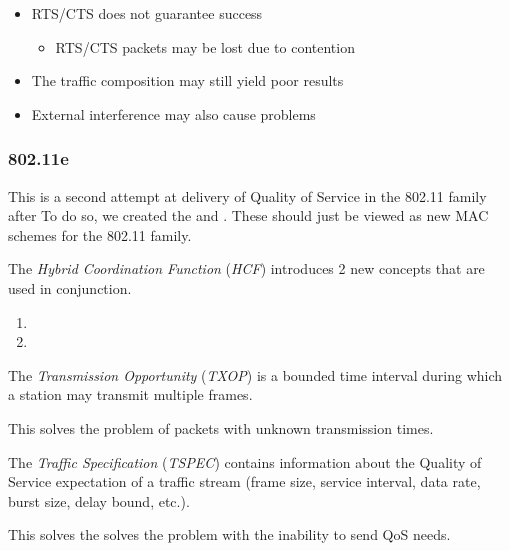 \begin{itemize}[noitemsep]
\item RTS/CTS does not guarantee success
  \begin{itemize}[noitemsep]
  \item RTS/CTS packets may be lost due to contention
  \end{itemize}

\item The traffic composition may still yield poor results
\item External interference may also cause problems
\end{itemize}

\subsubsection{802.11e}\label{subsubsec:802.11e}
This is a second attempt at delivery of Quality of Service in the 802.11 family after 
To do so, we created the  and .
These should just be viewed as new MAC schemes for the 802.11 family.

\begin{definition}\label{def:HCF}
  The \emph{Hybrid Coordination Function} (\emph{HCF}) introduces 2 new concepts that are used in conjunction.
  \begin{enumerate}[noitemsep]
  \item {}
  \item {}
  \end{enumerate}
\end{definition}

\begin{definition}\label{def:Tx_Opportunity}
  The \emph{Transmission Opportunity} (\emph{TXOP}) is a bounded time interval during which a station may transmit multiple frames.

  This solves the  problem of packets with unknown transmission times.
\end{definition}

\begin{definition}\label{def:Traffic_Specification}
  The \emph{Traffic Specification} (\emph{TSPEC}) contains information about the Quality of Service expectation of a traffic stream (frame size, service interval, data rate, burst size, delay bound, etc.).

  This solves the solves the  problem with the inability to send QoS needs.
\end{definition}


